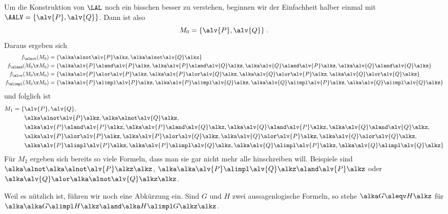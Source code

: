 Um die Konstruktion von $\LAL$
noch ein bisschen besser zu verstehen, beginnen wir der Einfachheit
halber einmal mit $\AALV = \{ \alv{P}, \alv{Q} \}$.
%
Dann ist also
%
\[
  M_0 = \{ \alv{P}, \alv{Q} \} \;.
\]
%
Daraus ergeben sich
%
\begin{align*}
  f_{\alnot}(M_0) &= \{  \alka\alnot\alv{P}\alkz, \alka\alnot\alv{Q}\alkz  \} \\
  f_{\aland}(M_0\x M_0) &= \{  \alka\alv{P}\aland\alv{P}\alkz, \alka\alv{P}\aland\alv{Q}\alkz,
                          \alka\alv{Q}\aland\alv{P}\alkz, \alka\alv{Q}\aland\alv{Q}\alkz \} \\
  f_{\alor}(M_0\x M_0) &= \{  \alka\alv{P}\alor\alv{P}\alkz, \alka\alv{P}\alor\alv{Q}\alkz,
                          \alka\alv{Q}\alor\alv{P}\alkz, \alka\alv{Q}\alor\alv{Q}\alkz \} \\
  f_{\alimpl}(M_0\x M_0) &= \{  \alka\alv{P}\alimpl\alv{P}\alkz, \alka\alv{P}\alimpl\alv{Q}\alkz,
                          \alka\alv{Q}\alimpl\alv{P}\alkz, \alka\alv{Q}\alimpl\alv{Q}\alkz \} 
\end{align*}
%
und folglich ist
%
\begin{align*}
  M_1 = \{ &\alv{P}, \alv{Q}, \\
           &\alka\alnot\alv{P}\alkz, \alka\alnot\alv{Q}\alkz,   \\
           &\alka\alv{P}\aland\alv{P}\alkz, \alka\alv{P}\aland\alv{Q}\alkz,
             \alka\alv{Q}\aland\alv{P}\alkz, \alka\alv{Q}\aland\alv{Q}\alkz,  \\
           &\alka\alv{P}\alor\alv{P}\alkz, \alka\alv{P}\alor\alv{Q}\alkz,
             \alka\alv{Q}\alor\alv{P}\alkz, \alka\alv{Q}\alor\alv{Q}\alkz, \\
           &\alka\alv{P}\alimpl\alv{P}\alkz, \alka\alv{P}\alimpl\alv{Q}\alkz,
             \alka\alv{Q}\alimpl\alv{P}\alkz, \alka\alv{Q}\alimpl\alv{Q}\alkz \} 
\end{align*}
%
Für $M_2$ ergeben sich bereits so viele Formeln, dass man sie gar
nicht mehr alle hinschreiben will.
%
Beispiele sind $\alka \alnot \alka\alnot\alv{P}\alkz \alkz$,
$\alka\alka\alv{P}\alimpl\alv{Q}\alkz \aland
\alv{P} \alkz$
oder $\alka \alv{Q} \alor \alka\alnot \alv{Q}\alkz \alkz$.

Weil es nützlich ist, führen wir noch eine Abkürzung ein.
%
Sind $G$
und $H$
zwei aussagenlogische Formeln, so stehe $\alka G \aleqv H \alkz$
für
$\alka \alka G \alimpl H \alkz \aland \alka H \alimpl G \alkz \alkz$.

